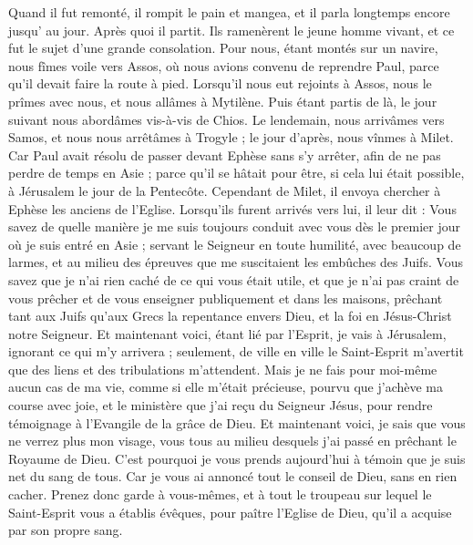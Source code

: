 \begin{multicols}{2}
Quand il fut remonté, il rompit le pain et mangea, et il parla longtemps encore jusqu' au jour. Après quoi il partit.
Ils ramenèrent le jeune homme vivant, et ce fut le sujet d’une grande consolation.
Pour nous, étant montés sur un navire, nous fîmes voile vers Assos, où nous avions convenu de reprendre Paul, parce qu’il devait faire la route à pied.
Lorsqu’il nous eut rejoints à Assos, nous le prîmes avec nous, et nous allâmes à Mytilène.
Puis étant partis de là, le jour suivant nous abordâmes vis-à-vis de Chios. Le lendemain, nous arrivâmes vers Samos, et nous nous arrêtâmes à Trogyle ; le jour d’après, nous vînmes à Milet.
Car Paul avait résolu de passer devant Ephèse sans s’y arrêter, afin de ne pas perdre de temps en Asie ; parce qu'il se hâtait pour être, si cela lui était possible, à Jérusalem le jour de la Pentecôte.
Cependant de Milet, il envoya chercher à Ephèse les anciens de l'Eglise.
Lorsqu’ils furent arrivés vers lui, il leur dit : Vous savez de quelle manière je me suis toujours conduit avec vous dès le premier jour où je suis entré en Asie ;
servant le Seigneur en toute humilité, avec beaucoup de larmes, et au milieu des épreuves que me suscitaient les embûches des Juifs.
Vous savez que je n’ai rien caché de ce qui vous était utile, et que je n’ai pas craint de vous prêcher et de vous enseigner publiquement et dans les maisons,
prêchant tant aux Juifs qu’aux Grecs la repentance envers Dieu, et la foi en Jésus-Christ notre Seigneur.
Et maintenant voici, étant lié par l'Esprit, je vais à Jérusalem, ignorant ce qui m’y arrivera ;
seulement, de ville en ville le Saint-Esprit m'avertit que des liens et des tribulations m'attendent.
Mais je ne fais pour moi-même aucun cas de ma vie, comme si elle m’était précieuse, pourvu que j'achève ma course avec joie, et le ministère que j'ai reçu du Seigneur Jésus, pour rendre témoignage à l'Evangile de la grâce de Dieu.
Et maintenant voici, je sais que vous ne verrez plus mon visage, vous tous au milieu desquels j’ai passé en prêchant le Royaume de Dieu.
C'est pourquoi je vous prends aujourd'hui à témoin que je suis net du sang de tous.
Car je vous ai annoncé tout le conseil de Dieu, sans en rien cacher.
Prenez donc garde à vous-mêmes, et à tout le troupeau sur lequel le Saint-Esprit vous a établis évêques, pour paître l'Eglise de Dieu, qu’il a acquise par son propre sang.

\end{multicols}
